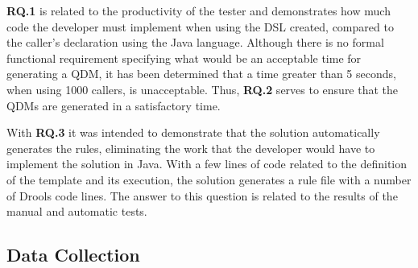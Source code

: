 
\textbf{RQ.1} is related to the productivity of the tester and demonstrates how much code the developer must implement when using the DSL created, compared to the caller's declaration using the Java language. Although there is no formal functional requirement specifying what would be an acceptable time for generating a QDM, it has been determined that a time greater than 5 seconds, when using 1000 callers, is unacceptable. Thus, \textbf{RQ.2} serves to ensure that the QDMs are generated in a satisfactory time.


With \textbf{RQ.3} it was intended to demonstrate that the solution automatically generates the rules, eliminating the work that the developer would have to implement the solution in Java. With a few lines of code related to the definition of the template and its execution, the solution generates a rule file with a number of Drools code lines. The answer to this question is related to the results of the manual and automatic tests.

\subsection{Data Collection}


